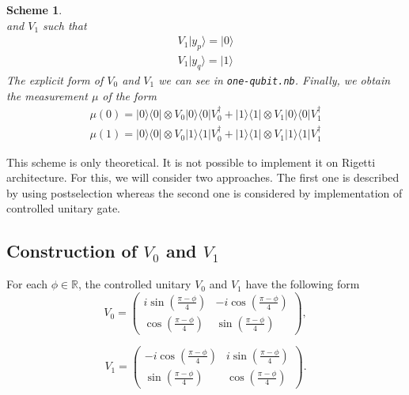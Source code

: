 \documentclass[11pt,a4paper,reqno, oneside]{amsart}
\newcommand{\R}{\ensuremath{\mathbb{R}}}
\newcommand{\ket}[1]{\ensuremath{|#1\rangle}}
\newcommand{\bra}[1]{\ensuremath{\langle#1|}}
\newcommand{\ketbra}[2]{\ensuremath{\ket{#1} \! \bra{#2}}}
\newcommand{\proj}[1]{\ensuremath{\ketbra{#1}{#1}}}
\newcommand{\1}{{\rm 1\hspace{-0.9mm}l}}
\newtheorem{scheme}{Scheme}
\begin{document}
\begin{scheme}
\begin{equation}
	\end{equation}
	and $V_1$ such that
	\begin{equation}
	\begin{split}
	V_1 \ket{y_p} = \ket{0} \\ 
	V_1 \ket{y_q} = \ket{1}
	\end{split}
	\end{equation}
	The explicit form of $V_0$ and $V_1$ we can see in \texttt{one-qubit.nb}.
	Finally, we obtain the measurement $\mu$ of the form
	\begin{equation}
	\begin{split}
	 \mu(0) = \proj{0} \otimes V_0 \proj{0} V_0^\dagger +  \proj{1} \otimes V_1 
	 \proj{0} V_1^\dagger  \\ 
	\mu(1) = \proj{0} \otimes V_0 \proj{1} V_0^\dagger +  \proj{1} \otimes V_1 
	\proj{1} V_1^\dagger  
	\end{split}
	\end{equation}
\end{scheme}
This scheme is only theoretical. It is not possible to implement it on Rigetti 
architecture. For this, we will consider two approaches. The first one is 
described  by using postselection whereas the second one is considered by implementation 
of controlled unitary gate. 

\subsection{Construction of $V_0$ and $V_1$}
	For each $\phi \in \R$,  the controlled unitary $V_0$ and $V_1$ have the following form
	\begin{equation}
	V_0 = \left(\begin{array}{cc}i \sin\left( \frac{\pi - \phi}{4} \right)&-i \cos\left( \frac{\pi - \phi}{4} \right)\\ \cos\left( \frac{\pi - \phi}{4}\right)& \sin\left( \frac{\pi - \phi}{4} \right)\end{array}\right),
	\end{equation}
	
		\begin{equation}
	V_1 = \left(\begin{array}{cc}-i \cos\left(\frac{\pi - \phi}{4}\right) &i \sin\left( \frac{\pi - \phi}{4}\right)\\\sin\left( \frac{\pi - \phi}{4} \right) &  \cos\left( \frac{\pi - \phi}{4} \right) \end{array}\right).
	\end{equation}
	
\end{document}
